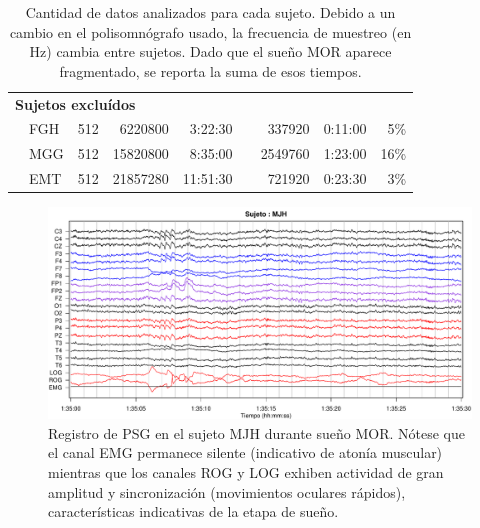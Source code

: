 \documentclass[12pt,a4paper]{mitthesis}
\begin{document}
\begin{table}
\begin{tabular}{llcrrcrrr}
\midrule

\multicolumn{6}{l}{\textbf{Sujetos exclu\'idos}}\\
&FGH &512       &6220800 &   3:22:30 &&337920  &   0:11:00 & 5\% \\
&MGG &512       &15820800&   8:35:00 &&2549760 &   1:23:00 &16\% \\
&EMT &512       &21857280&  11:51:30 &&721920  &   0:23:30 & 3\% \\
\bottomrule
\end{tabular}
\caption{Cantidad de datos analizados para cada sujeto. Debido a un cambio en el polisomn\'ografo 
usado, la frecuencia de muestreo (en Hz) cambia entre sujetos.
Dado que el sue\~no MOR aparece fragmentado, se reporta la suma de esos tiempos.}
\label{frecuencias}
\end{table}

\begin{figure}
\centering
\includegraphics[width=\linewidth]
{./p_170427/MJH_190_PDG_lucirse_PSG.pdf}
\caption{Registro de PSG en el sujeto MJH durante sue\~no MOR. N\'otese que el canal EMG permanece 
silente (indicativo de aton\'ia muscular) mientras que los canales ROG y LOG exhiben actividad de 
gran amplitud y sincronizaci\'on (movimientos oculares r\'apidos), caracter\'isticas indicativas de
la etapa de sue\~no.}
\label{ejemplos_mor}
\end{figure}


\end{document}
